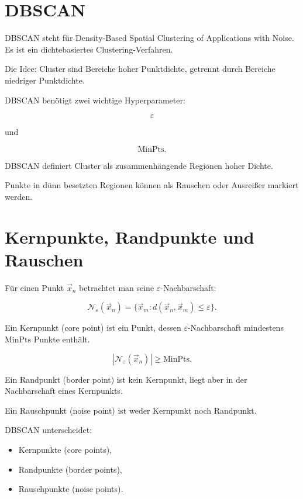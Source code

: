 \section{DBSCAN}

DBSCAN steht für Density-Based Spatial Clustering of Applications with Noise.
Es ist ein dichtebasiertes Clustering-Verfahren.

Die Idee:
Cluster sind Bereiche hoher Punktdichte, getrennt durch Bereiche niedriger Punktdichte.

DBSCAN benötigt zwei wichtige Hyperparameter:

\[
    \varepsilon
\]

und

\[
    \mathrm{MinPts}.
\]

\begin{definitionbox}
DBSCAN definiert Cluster als zusammenhängende Regionen hoher Dichte.

Punkte in dünn besetzten Regionen können als Rauschen oder Ausreißer markiert werden.
\end{definitionbox}

\section{Kernpunkte, Randpunkte und Rauschen}

Für einen Punkt \(\vec{x}_n\) betrachtet man seine \(\varepsilon\)-Nachbarschaft:

\[
    \mathcal{N}_{\varepsilon}(\vec{x}_n)
    =
    \{\vec{x}_m : d(\vec{x}_n,\vec{x}_m)\leq \varepsilon\}.
\]

Ein Kernpunkt (core point) ist ein Punkt, dessen \(\varepsilon\)-Nachbarschaft mindestens \(\mathrm{MinPts}\) Punkte enthält.

\[
    |\mathcal{N}_{\varepsilon}(\vec{x}_n)|
    \geq
    \mathrm{MinPts}.
\]

Ein Randpunkt (border point) ist kein Kernpunkt, liegt aber in der Nachbarschaft eines Kernpunkts.

Ein Rauschpunkt (noise point) ist weder Kernpunkt noch Randpunkt.

\begin{definitionbox}
DBSCAN unterscheidet:

\begin{itemize}
    \item Kernpunkte (core points),
    \item Randpunkte (border points),
    \item Rauschpunkte (noise points).
\end{itemize}
\end{definitionbox}

